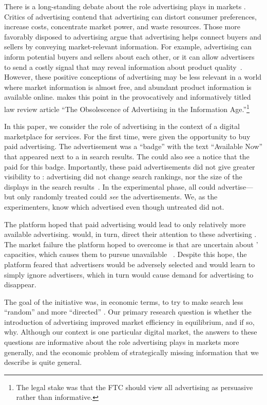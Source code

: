 There is a long-standing debate about the role advertising plays in markets \citep{bagwell2007economic}.
Critics of advertising contend that advertising can distort consumer preferences, increase costs, concentrate market power, and waste resources.
Those more favorably disposed to advertising argue that advertising helps connect buyers and sellers by conveying market-relevant information.
For example, advertising can inform potential buyers and sellers about each other, or it can allow advertisers to send a costly signal that may reveal information about product quality~\citep{stigler1961economics, nelson1974, milgromroberts1986}.
However, these positive conceptions of advertising may be less relevant in a world where market information is almost free, and abundant product information is available online.
\cite{woodcock2017obsolescence} makes this point in the provocatively and informatively titled law review article ``The Obsolescence of Advertising in the Information Age.''\footnote{The legal stake was that the FTC should view all advertising as persuasive rather than informative.}

In this paper, we consider the role of advertising in the context of a digital marketplace for services. 
For the first time, \fls{} were given the opportunity to buy paid advertising.
The advertisement was a ``badge'' with the text ``Available Now'' that appeared next to a \fl{} in search results.
The \cl{} could also see a notice that the \fl{} paid for this badge. 
Importantly, these paid advertisements did not give \fls{} greater visibility to \cls{}:
advertising did not change search rankings, nor the size of the displays in the search results~\citep{edelman2007internet, athey2011, decarolis}.
In the experimental phase, all \fls{} could advertise---but only randomly treated \cls{} could \emph{see} the advertisements.
We, as the experimenters, know which \fls{} advertised even though untreated \cls{} did not.

The platform hoped that paid advertising would lead to only relatively more available \fls{} advertising.
\CLS{} would, in turn, direct their attention to these advertising \fls{}.
The market failure the platform hoped to overcome is that \cls{} are uncertain about \fls{}' capacities, which causes them to  pursue unavailable \fls{}~\citep{horton2019buyer,fradkin2023search}.
Despite this hope, the platform feared that advertisers would be adversely selected and \cls{} would learn to simply ignore advertisers, which in turn would cause demand for advertising to disappear.

The goal of the initiative was, in economic terms, to try to make search less ``random'' \citep{mortensen1994job} and more ``directed'' \citep{wright2021directed}.
Our primary research question is whether the introduction of advertising improved market efficiency in equilibrium, and if so, why.
Although our context is one particular digital market, the answers to these questions are informative about the role advertising plays in markets more generally, and the economic problem of strategically missing information that we describe is quite general.
